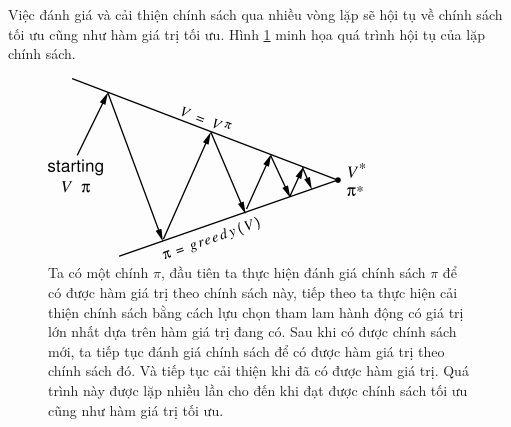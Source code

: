 Việc đánh giá và cải thiện chính sách qua nhiều vòng lặp sẽ hội tụ về chính sách tối ưu cũng như hàm giá trị tối ưu. Hình \ref{fig:policy_iteration_MDP} minh họa quá trình hội tụ của lặp chính sách.
\begin{figure}
	\centering
	\includegraphics[width=\textwidth]{policy_iteration}
	\caption{Ta có một chính $\pi$, đầu tiên ta thực hiện đánh giá chính sách $\pi$ để có được hàm giá trị theo chính sách này, tiếp theo ta thực hiện cải thiện chính sách bằng cách lựu chọn tham lam hành động có giá trị lớn nhất dựa trên hàm giá trị đang có. Sau khi có được chính sách mới, ta tiếp tục đánh giá chính sách để có được hàm giá trị theo chính sách đó. Và tiếp tục cải thiện khi đã có được hàm giá trị. Quá trình này được lặp nhiều lần cho đến khi đạt được chính sách tối ưu cũng như hàm giá trị tối ưu.}
	\label{fig:policy_iteration_MDP}
	
\end{figure}

